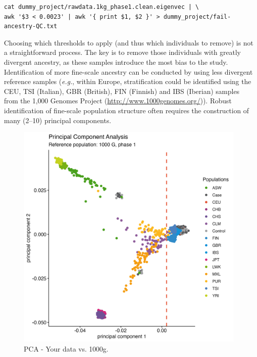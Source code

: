 \documentclass[
]{book}
\begin{document}
\begin{lstlisting}
cat dummy_project/rawdata.1kg_phase1.clean.eigenvec | \
awk '$3 < 0.0023' | awk '{ print $1, $2 }' > dummy_project/fail-ancestry-QC.txt
\end{lstlisting}

Choosing which thresholds to apply (and thus which individuals to remove) is not a straightforward process. The key is to remove those individuals with greatly divergent ancestry, as these samples introduce the most bias to the study. Identification of more fine-scale ancestry can be conducted by using less divergent reference samples (\emph{e.g.}, within Europe, stratification could be identified using the CEU, TSI (Italian), GBR (British), FIN (Finnish) and IBS (Iberian) samples from the 1,000 Genomes Project (\url{http://www.1000genomes.org/})). Robust identification of fine-scale population structure often requires the construction of many (2--10) principal components.

\begin{figure}[H]

{\centering \includegraphics[width=29.17in]{img/_gwas_dummy/gwas-qc-pca-1000g} 

}

\caption{PCA - Your data vs. 1000g.}\label{fig:show-pca-1000g}
\end{figure}
\end{document}
